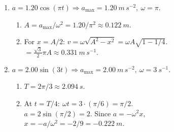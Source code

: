 \documentclass[12pt]{article}
\begin{document}
\begin{enumerate}
\item \(a=1.20\cos(\pi t)\Rightarrow a_{\max}=\SI{1.20}{m\,s^{-2}},\ \omega=\pi\).
\begin{enumerate}[label=\alph*)]
\item \(A=a_{\max}/\omega^{2}=1.20/\pi^{2}\approx\boxed{\SI{0.122}{m}}\).
\item For \(x=A/2\): \(v=\omega\sqrt{A^{2}-x^{2}}=\omega A\sqrt{1-1/4} \). \\
\(=\tfrac{\sqrt{3}}{2}\pi A\approx \boxed{\SI{0.331}{m\,s^{-1}}}\).
\end{enumerate}

\item \(a=2.00\sin(3t)\Rightarrow a_{\max}=\SI{2.00}{m\,s^{-2}},\ \omega=\SI{3}{s^{-1}}\).
\begin{enumerate}[label=\alph*)]
\item \(T=2\pi/3\approx\boxed{\SI{2.094}{s}}\).
\item At \(t=T/4:\ \omega t=3\cdot (\pi/6)=\pi/2\). \\
\(a=2\sin(\pi/2)=2\). Since \(a=-\omega^{2}x\), \\
\(x=-a/\omega^{2}=-2/9=\boxed{\SI{-0.222}{m}}\).
\end{enumerate}

\end{enumerate}
\end{document}
